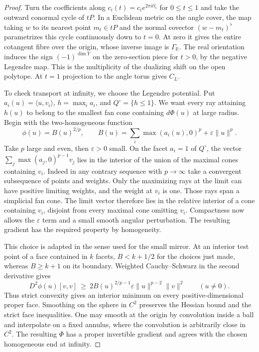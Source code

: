 \begin{proof}
Turn the coefficients along $c_i(t)=c_i e^{2\pi i t l_i}$ for $0\le t\le1$ and take the outward conormal cycle of $tP$. In a Euclidean metric on the angle cover, the map taking $w$ to its nearest point $m_t\in tP$ and the normal covector $(w-m_t)^\flat$ parametrizes this cycle continuously down to $t=0$. At zero it gives the entire cotangent fibre over the origin, whose inverse image is $\Gamma_{\mathbb R}$. The real orientation induces the sign $(-1)^{\dim Y}$ on the zero-section piece for $t>0$, by the negative Legendre map. This is the multiplicity of the dualizing shift on the open polytope. At $t=1$ projection to the angle torus gives $C_L$.

To check transport at infinity, we choose the Legendre potential. Put $a_i(u)=\langle u,v_i\rangle$, $h=\max_i a_i$, and $Q^\circ=\{h\le1\}$. We want every ray attaining $h(u)$ to belong to the smallest fan cone containing $d\Phi(u)$ at large radius. Begin with the two-homogeneous function
\[
 \phi(u)=B(u)^{2/p},\qquad
 B(u)=\sum_i\max(a_i(u),0)^p+\varepsilon\|u\|^p .
\]
Take $p$ large and even, then $\varepsilon>0$ small. On the facet $a_i=1$ of $Q^\circ$, the vector $\sum_j\max(a_j,0)^{p-1}v_j$ lies in the interior of the union of the maximal cones containing $v_i$. Indeed in any contrary sequence with $p\to\infty$ take a convergent subsequence of points and weights. Only the maximizing rays at the limit can have positive limiting weights, and the weight at $v_i$ is one. Those rays span a simplicial fan cone. The limit vector therefore lies in the relative interior of a cone containing $v_i$, disjoint from every maximal cone omitting $v_i$. Compactness now allows the $\varepsilon$ term and a small smooth angular perturbation. The resulting gradient has the required property by homogeneity.

This choice is adapted in the sense used for the small mirror. At an interior test point of a face contained in $k$ facets, $B<k+1/2$ for the choices just made, whereas $B\ge k+1$ on its boundary. Weighted Cauchy--Schwarz in the second derivative gives
\[
 D^2\phi(u)[v,v]\ \ge\ 2 B(u)^{2/p-1}\varepsilon\|u\|^{p-2}\|v\|^2
 \qquad (u\ne0).
\]
Thus strict convexity gives an interior minimum on every positive-dimensional proper face. Smoothing on the sphere in $C^2$ preserves the Hessian bound and the strict face inequalities. One may smooth at the origin by convolution inside a ball and interpolate on a fixed annulus, where the convolution is arbitrarily close in $C^2$. The resulting $\Phi$ has a proper invertible gradient and agrees with the chosen homogeneous end at infinity.


\end{proof}
